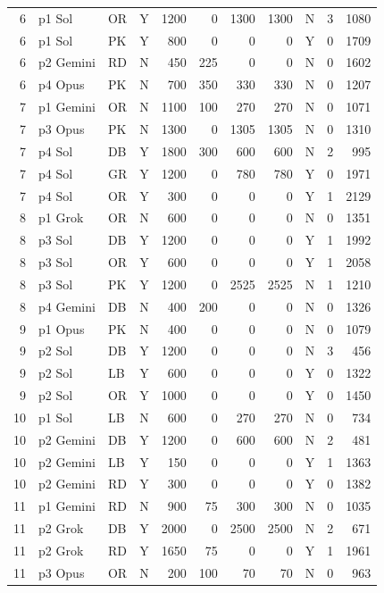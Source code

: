 \begin{longtable}{r l l l r r r r l r r}
6 & p1 Sol & OR & Y & 1200 & 0 & 1300 & 1300 & N & 3 & 1080 \\
6 & p1 Sol & PK & Y & 800 & 0 & 0 & 0 & Y & 0 & 1709 \\
6 & p2 Gemini & RD & N & 450 & 225 & 0 & 0 & N & 0 & 1602 \\
6 & p4 Opus & PK & N & 700 & 350 & 330 & 330 & N & 0 & 1207 \\
7 & p1 Gemini & OR & N & 1100 & 100 & 270 & 270 & N & 0 & 1071 \\
7 & p3 Opus & PK & N & 1300 & 0 & 1305 & 1305 & N & 0 & 1310 \\
7 & p4 Sol & DB & Y & 1800 & 300 & 600 & 600 & N & 2 & 995 \\
7 & p4 Sol & GR & Y & 1200 & 0 & 780 & 780 & Y & 0 & 1971 \\
7 & p4 Sol & OR & Y & 300 & 0 & 0 & 0 & Y & 1 & 2129 \\
8 & p1 Grok & OR & N & 600 & 0 & 0 & 0 & N & 0 & 1351 \\
8 & p3 Sol & DB & Y & 1200 & 0 & 0 & 0 & Y & 1 & 1992 \\
8 & p3 Sol & OR & Y & 600 & 0 & 0 & 0 & Y & 1 & 2058 \\
8 & p3 Sol & PK & Y & 1200 & 0 & 2525 & 2525 & N & 1 & 1210 \\
8 & p4 Gemini & DB & N & 400 & 200 & 0 & 0 & N & 0 & 1326 \\
9 & p1 Opus & PK & N & 400 & 0 & 0 & 0 & N & 0 & 1079 \\
9 & p2 Sol & DB & Y & 1200 & 0 & 0 & 0 & N & 3 & 456 \\
9 & p2 Sol & LB & Y & 600 & 0 & 0 & 0 & Y & 0 & 1322 \\
9 & p2 Sol & OR & Y & 1000 & 0 & 0 & 0 & Y & 0 & 1450 \\
10 & p1 Sol & LB & N & 600 & 0 & 270 & 270 & N & 0 & 734 \\
10 & p2 Gemini & DB & Y & 1200 & 0 & 600 & 600 & N & 2 & 481 \\
10 & p2 Gemini & LB & Y & 150 & 0 & 0 & 0 & Y & 1 & 1363 \\
10 & p2 Gemini & RD & Y & 300 & 0 & 0 & 0 & Y & 0 & 1382 \\
11 & p1 Gemini & RD & N & 900 & 75 & 300 & 300 & N & 0 & 1035 \\
11 & p2 Grok & DB & Y & 2000 & 0 & 2500 & 2500 & N & 2 & 671 \\
11 & p2 Grok & RD & Y & 1650 & 75 & 0 & 0 & Y & 1 & 1961 \\
11 & p3 Opus & OR & N & 200 & 100 & 70 & 70 & N & 0 & 963 \\

\end{longtable}
